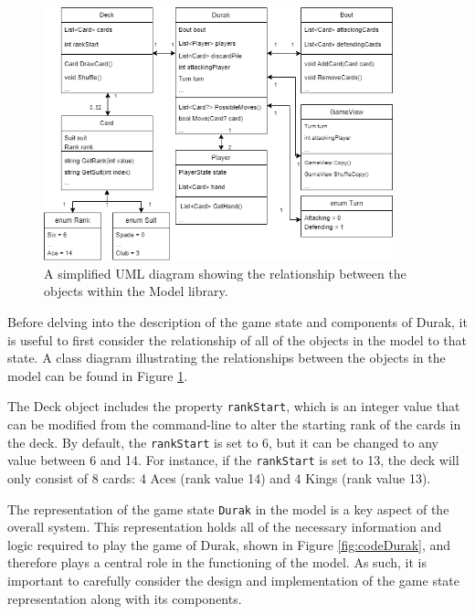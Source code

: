 \begin{figure}[h]
    \centering
    \captionsetup{justification=centering}
    \includegraphics[width=0.9\textwidth]{../img/modelUML.png}
    \caption{A simplified UML diagram showing the relationship between the objects within the Model library.}
    \label{fig:modelUML}
\end{figure}

Before delving into the description of the game state and components of Durak, it is useful to first consider the relationship of all of the objects in the model to that state. A class diagram illustrating the relationships between the objects in the model can be found in Figure \ref{fig:modelUML}.

The Deck object includes the property \texttt{rankStart}, which is an integer value that can be modified from the command-line to alter the starting rank of the cards in the deck. By default, the \texttt{rankStart} is set to 6, but it can be changed to any value between 6 and 14. For instance, if the \texttt{rankStart} is set to 13, the deck will only consist of 8 cards: 4 Aces (rank value 14) and 4 Kings (rank value 13). 

The representation of the game state \texttt{Durak} in the model is a key aspect of the overall system. This representation holds all of the necessary information and logic required to play the game of Durak, shown in Figure \ref{fig:codeDurak}, and therefore plays a central role in the functioning of the model. As such, it is important to carefully consider the design and implementation of the game state representation along with its components. 

